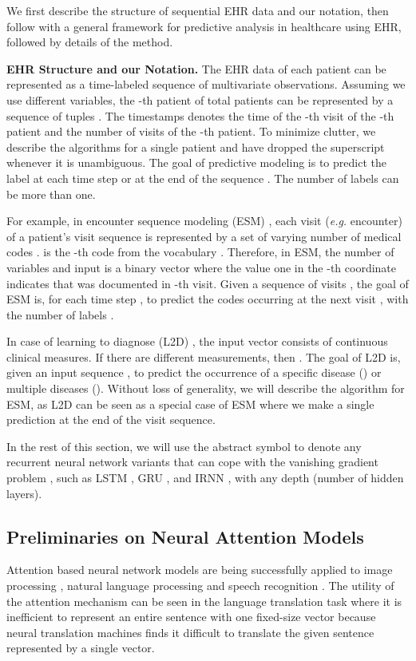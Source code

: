 We first describe the structure of sequential EHR data and our notation, then follow with a general framework for predictive analysis in healthcare using EHR, followed by details of the \alg method.

\textbf{EHR Structure and our Notation.} The EHR data of each patient can be represented as a time-labeled sequence of multivariate observations. Assuming we use  different variables, the -th patient of  total patients can be represented by a sequence of  tuples . The timestamps  denotes the time of the -th visit of the -th patient and  the number of visits of the -th patient. To minimize clutter, we describe the algorithms for a single patient and have dropped the superscript  whenever it is unambiguous. The goal of predictive modeling is to predict the label at each time step  or at the end of the sequence . The number of labels  can be more than one.

For example, in encounter sequence modeling (ESM) \cite{choi2015doctor}, each visit (\textit{e.g.} encounter) of a patient's visit sequence is represented by a set of varying number of medical codes .  is the -th code from the vocabulary . Therefore, in ESM, the number of variables  and input  is a binary vector where the value one in the -th coordinate indicates that  was documented in -th visit. Given a sequence of visits , the goal of ESM is, for each time step , to predict the codes occurring at the next visit , with the number of labels .

In case of learning to diagnose (L2D) \cite{lipton2015learning}, the input vector  consists of continuous clinical measures. If there are  different measurements, then . The goal of L2D is, given an input sequence , to predict the occurrence of a specific disease () or multiple diseases (). 
Without loss of generality, we will describe the algorithm for ESM, as L2D can be seen as a special case of ESM where we make a single prediction at the end of the visit sequence.

In the rest of this section, we will use the abstract symbol  to denote any recurrent neural network variants that can cope with the vanishing gradient problem \cite{bengio1994learning}, such as LSTM \cite{hochreiter1997long}, GRU \cite{cho2014learning}, and IRNN \cite{le2015simple}, with any depth (number of hidden layers). 

\subsection{Preliminaries on Neural Attention Models}
\label{sec:attention}
Attention based neural network models are being successfully applied to image processing \cite{ba2014multiple,mnih2014recurrent,gregor2015draw,xu2015show}, natural language processing \cite{bahdanau2014neural,hermann2015teaching,rush2015neural} and speech recognition \cite{chorowski2015attention}. The utility of the attention mechanism can be seen in the language translation task \cite{bahdanau2014neural} where it is inefficient to represent an entire sentence with one fixed-size vector because neural translation machines finds it difficult to translate the given sentence represented by a single vector. 

